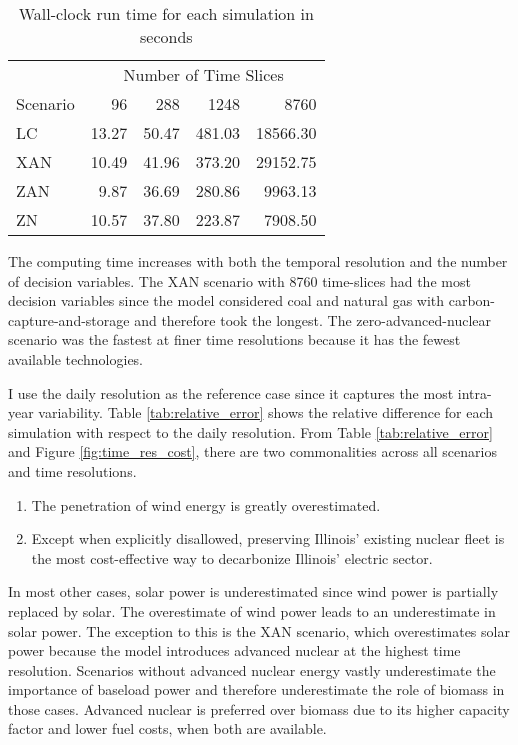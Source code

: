\begin{table}[H]
  \centering
  \caption{Wall-clock run time for each simulation in seconds}
  \label{tab:time_res_clock}
  \begin{tabular}{l*{4}{r}}
    \toprule
    & \multicolumn{4}{c}{Number of Time Slices}\\
    Scenario & 96 & 288 & 1248&8760\\
    \midrule
    LC &13.27&50.47&481.03&18566.30\\
    XAN &10.49&41.96&373.20&29152.75\\
    ZAN &9.87&36.69&280.86&9963.13\\
    ZN & 10.57&37.80&223.87&7908.50\\
    \bottomrule
  \end{tabular}
\end{table}

The computing time increases with both the temporal resolution and the number of
decision variables. The \gls{XAN} scenario with 8760 time-slices had the most decision
variables since the model considered coal and natural gas with
carbon-capture-and-storage and therefore took the longest. The zero-advanced-nuclear
scenario was the fastest at finer time resolutions because it has the fewest
available technologies.

I use the daily resolution as the reference case since it captures the most
intra-year variability.
Table \ref{tab:relative_error} shows the relative difference for each simulation
with respect to the daily resolution. From Table \ref{tab:relative_error} and
Figure \ref{fig:time_res_cost}, there are two commonalities across all scenarios
and time resolutions.
\begin{enumerate}
  \item The penetration of wind energy is greatly overestimated.
  \item Except when explicitly disallowed, preserving Illinois' existing nuclear
  fleet is the most cost-effective way to decarbonize Illinois' electric sector.
\end{enumerate}
In most other cases, solar power is underestimated since wind power is partially
replaced by solar. The overestimate of wind power leads to an underestimate in
solar power. The exception to this is the \gls{XAN} scenario, which overestimates
solar power because the model introduces advanced nuclear at the highest time resolution.
Scenarios without advanced nuclear energy vastly underestimate the importance of
baseload power and therefore underestimate the role of biomass in those cases.
Advanced nuclear is preferred over biomass due to its higher capacity factor and
lower fuel costs, when both are available.

